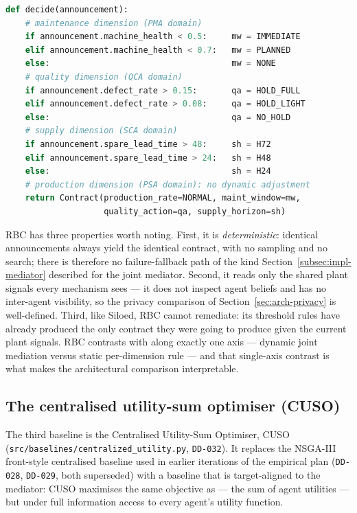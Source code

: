 \begin{lstlisting}[language=Python,caption={The RBC threshold table
(simplified from \texttt{src/baselines/rbc.py}); each dimension's
decision is a function of one plant signal only.},label={lst:impl-rbc}]
def decide(announcement):
    # maintenance dimension (PMA domain)
    if announcement.machine_health < 0.5:     mw = IMMEDIATE
    elif announcement.machine_health < 0.7:   mw = PLANNED
    else:                                     mw = NONE
    # quality dimension (QCA domain)
    if announcement.defect_rate > 0.15:       qa = HOLD_FULL
    elif announcement.defect_rate > 0.08:     qa = HOLD_LIGHT
    else:                                     qa = NO_HOLD
    # supply dimension (SCA domain)
    if announcement.spare_lead_time > 48:     sh = H72
    elif announcement.spare_lead_time > 24:   sh = H48
    else:                                     sh = H24
    # production dimension (PSA domain): no dynamic adjustment
    return Contract(production_rate=NORMAL, maint_window=mw,
                    quality_action=qa, supply_horizon=sh)
\end{lstlisting}

RBC has three properties worth noting. First, it is \emph{deterministic}:
identical announcements always yield the identical contract, with no
sampling and no search; there is therefore no failure-fallback path of
the kind Section~\ref{subsec:impl-mediator} described for the joint
mediator. Second, it reads only the shared plant signals every
mechanism sees --- it does not inspect agent beliefs and has no
inter-agent visibility, so the privacy comparison of
Section~\ref{sec:arch-privacy} is well-defined. Third, like Siloed, RBC
cannot remediate: its threshold rules have already produced the only
contract they were going to produce given the current plant signals.
RBC contrasts with \NEXUS{} along exactly one axis --- dynamic joint
mediation versus static per-dimension rule --- and that single-axis
contrast is what makes the architectural comparison interpretable.

\subsection{The centralised utility-sum optimiser (CUSO)}
\label{subsec:impl-cuso}

The third baseline is the Centralised Utility-Sum Optimiser, CUSO
(\texttt{src/baselines/centralized\_utility.py}, \texttt{DD-032}). It
replaces the NSGA-III front-style centralised baseline used in earlier
iterations of the empirical plan (\texttt{DD-028}, \texttt{DD-029},
both superseded) with a baseline that is target-aligned to the
\NEXUS{} mediator: CUSO maximises the same objective as \NEXUS{} ---
the sum of agent utilities --- but under full information access to
every agent's utility function.

